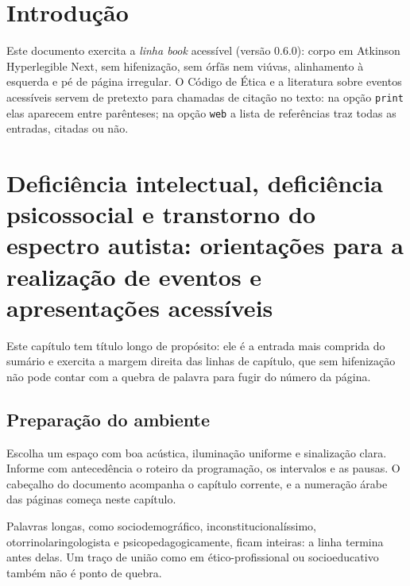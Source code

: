 
\chapter{Introdução}

Este documento exercita a \emph{linha book} acessível (versão 0.6.0): corpo em
Atkinson Hyperlegible Next, sem hifenização, sem órfãs nem viúvas, alinhamento à
esquerda e pé de página irregular. O Código de Ética \parencite{cfp2005} e a
literatura sobre eventos acessíveis \parencite{exemplo2020,exemplo2024} servem de
pretexto para chamadas de citação no texto: na opção \texttt{print} elas aparecem
entre parênteses; na opção \texttt{web} a lista de referências traz todas as
entradas, citadas ou não.

\iniciotextual

\chapter{Deficiência intelectual, deficiência psicossocial e transtorno do espectro autista: orientações para a realização de eventos e apresentações acessíveis}

Este capítulo tem título longo de propósito: ele é a entrada mais comprida do
sumário e exercita a margem direita das linhas de capítulo, que sem hifenização
não pode contar com a quebra de palavra para fugir do número da página.

\section{Preparação do ambiente}

Escolha um espaço com boa acústica, iluminação uniforme e sinalização clara.
Informe com antecedência o roteiro da programação, os intervalos e as pausas. O
cabeçalho do documento acompanha o capítulo corrente, e a numeração árabe das
páginas começa neste capítulo.

Palavras longas, como sociodemográfico, inconstitucionalíssimo, otorrinolaringologista
e psicopedagogicamente, ficam inteiras: a linha termina antes delas. Um traço de
união como em ético-profissional ou socioeducativo também não é ponto de quebra.

